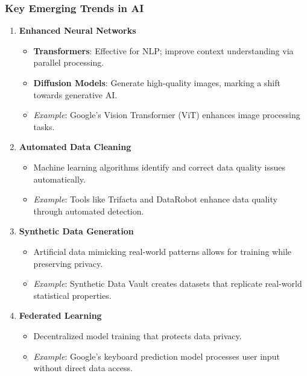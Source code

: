 \documentclass[aspectratio=169]{beamer}
\begin{document}
\begin{frame}[fragile]
    \frametitle{Key Emerging Trends in AI}
    \begin{enumerate}
        \item \textbf{Enhanced Neural Networks}
            \begin{itemize}
                \item \textbf{Transformers}: Effective for NLP; improve context understanding via parallel processing.
                \item \textbf{Diffusion Models}: Generate high-quality images, marking a shift towards generative AI.
                \item \textit{Example}: Google’s Vision Transformer (ViT) enhances image processing tasks.
            \end{itemize}

        \item \textbf{Automated Data Cleaning}
            \begin{itemize}
                \item Machine learning algorithms identify and correct data quality issues automatically.
                \item \textit{Example}: Tools like Trifacta and DataRobot enhance data quality through automated detection.
            \end{itemize}

        \item \textbf{Synthetic Data Generation}
            \begin{itemize}
                \item Artificial data mimicking real-world patterns allows for training while preserving privacy.
                \item \textit{Example}: Synthetic Data Vault creates datasets that replicate real-world statistical properties.
            \end{itemize}

        \item \textbf{Federated Learning}
            \begin{itemize}
                \item Decentralized model training that protects data privacy.
                \item \textit{Example}: Google’s keyboard prediction model processes user input without direct data access.
            \end{itemize}
    \end{enumerate}
\end{frame}
\end{document}
